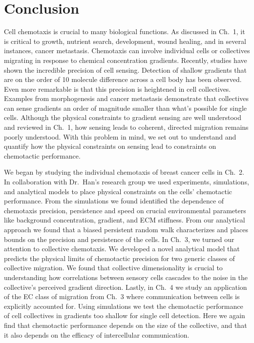 
\chapter{Conclusion}

\noindent
Cell chemotaxis is crucial to many biological functions. As discussed in Ch.\ 1, it is critical to growth, nutrient search, development, wound healing, and in several instances, cancer metastasis. Chemotaxis can involve individual cells or collectives migrating in response to chemical concentration gradients. Recently, studies have shown the incredible precision of cell sensing. Detection of shallow gradients that are on the order of 10 molecule difference across a cell body has been observed. Even more remarkable is that this precision is heightened in cell collectives. Examples from morphogenesis and cancer metastasis demonstrate that collectives can sense gradients an order of magnitude smaller than what's possible for single cells. Although the physical constraints to gradient sensing are well understood and reviewed in Ch.\ 1, how sensing leads to coherent, directed migration remains poorly understood. With this problem in mind, we set out to understand and quantify how the physical constraints on sensing lead to constraints on chemotactic performance.

We began by studying the individual chemotaxis of breast cancer cells in Ch.\ 2. In collaboration with Dr.\ Han's research group we used experiments, simulations, and analytical models to place physical constraints on the cells' chemotactic performance. From the simulations we found identified the dependence of chemotaxis precision, persistence and speed on crucial environmental parameters like background concentration, gradient, and ECM stiffness. From our analytical approach we found that a biased persistent random walk characterizes and places bounds on the precision and persistence of the cells. In Ch.\ 3, we turned our attention to collective chemotaxis. We developed a novel analytical model that predicts the physical limits of chemotactic precision for two generic classes of collective migration. We found that collective dimensionality is crucial to understanding how correlations between sensory cells cascades to the noise in the collective's perceived gradient direction. Lastly, in Ch.\ 4 we study an application of the EC class of migration from Ch.\ 3 where communication between cells is explicitly accounted for. Using simulations we test the chemotactic performance of cell collectives in gradients too shallow for single cell detection. Here we again find that chemotactic performance depends on the size of the collective, and that it also depends on the efficacy of intercellular communication.


